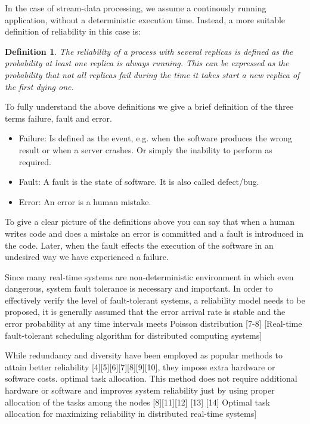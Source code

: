 \documentclass{cslthse-msc}
\newtheorem{definition}{Definition}[chapter]
\begin{document}
In the case of stream-data processing, we assume a continously running application, without a deterministic execution time. Instead, a more suitable definition of reliability in this case is:

\begin{definition} \label{def:dyn_repl_reliability}
The reliability of a process with several replicas is defined as the probability at least one replica is always running. This can be expressed as the probability that not all replicas fail during the time it takes start a new replica of the first dying one.
\end{definition}

To fully understand the above definitions we give a brief definition of the three terms failure, fault and error. 
\begin{itemize}
\item Failure: Is defined as the event, e.g. when the software produces the wrong result or when a server crashes. Or simply the inability to perform as required.
\item Fault: A fault is the state of software. It is also called defect/bug.
\item Error: An error is a human mistake.
\end{itemize} 
To give a clear picture of the definitions above you can say that when a human writes code and does a mistake an error is committed and a fault is introduced in the code. Later, when the fault effects the execution of the software in an undesired way we have experienced a failure. 

Since many real-time systems are non-deterministic environment in which even dangerous, system fault tolerance is necessary and important. In order to effectively verify the level of fault-tolerant systems, a reliability model needs to be proposed, it is generally assumed that the error arrival rate is stable and the error probability at any time intervals meets Poisson distribution [7-8] [Real-time fault-tolerant scheduling algorithm for distributed computing systems]

While redundancy and diversity have been employed as popular methods to attain better reliability [4][5][6][7][8][9][10], they impose extra hardware or software costs.
optimal task allocation. This method does not require additional hardware or software and improves system reliability just by using proper allocation of the tasks among the nodes [8][11][12] [13] [14] Optimal task allocation for maximizing reliability in distributed real-time systems]
\end{document}
